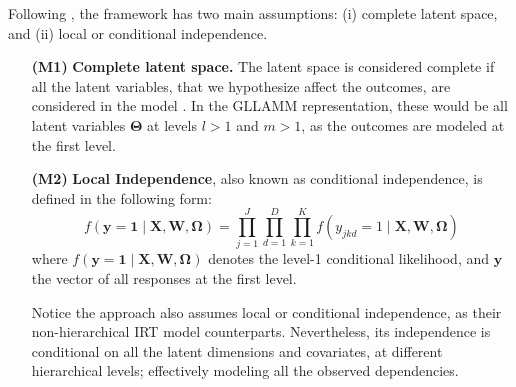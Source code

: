 Following \citet{Skrondal_et_al_2004a}, the framework has two main assumptions: (i) complete latent space, and (ii) local or conditional independence.
%
\begin{enumerate}
	\item[\textbf{(M1)}] \textbf{Complete latent space.} The latent space is considered complete if all the latent variables, that we hypothesize affect the outcomes, are considered in the model \citep{Hambleton_et_al_1991b}. In the GLLAMM representation, these would be all latent variables $\pmb{\Theta}$ at levels $l > 1$ and $m > 1$, as the outcomes are modeled at the first level.
	\item[\textbf{(M2)}] \textbf{Local Independence}, also known as conditional independence, is defined in the following form:
	\begin{equation} \label{eq:independence}
		f \left( \mathbf{y} = \mathbf{1} \; | \; \mathbf{X}, \mathbf{W}, \pmb{\Omega} \right) = \prod_{j=1}^{J} \prod_{d=1}^{D} \prod_{k=1}^{K} f \left( y_{jkd}=1 \; | \; \mathbf{X}, \mathbf{W}, \pmb{\Omega} \right)
	\end{equation}
	\noindent where $f \left( \mathbf{y} = \mathbf{1} \; | \; \mathbf{X}, \mathbf{W}, \pmb{\Omega} \right)$ denotes the level-1 conditional likelihood, and $\mathbf{y}$ the vector of all responses at the first level. 
	
	Notice the approach also assumes local or conditional independence, as their non-hierarchical IRT model counterparts. Nevertheless, its independence is conditional on all the latent dimensions and covariates, at different hierarchical levels; effectively modeling all the observed dependencies.
	

\end{enumerate}
